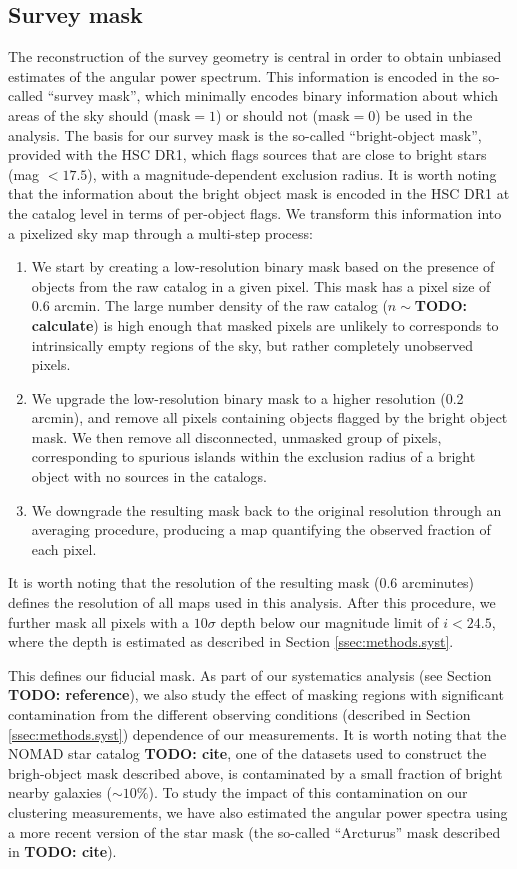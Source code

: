 \documentclass[a4paper,11pt]{article}
\newcommand{\todo}[1]{{\bf TODO: #1}}
\begin{document}
  \subsection{Survey mask}\label{ssec:methods.mask}
    The reconstruction of the survey geometry is central in order to obtain unbiased estimates of the angular power spectrum. This information is encoded in the so-called ``survey mask'', which minimally encodes binary information about which areas of the sky should (mask$=1$) or should not (mask$=0$) be used in the analysis. The basis for our survey mask is the so-called ``bright-object mask'', provided with the HSC DR1, which flags sources that are close to bright stars (mag $<17.5$), with a magnitude-dependent exclusion radius. It is worth noting that the information about the bright object mask is encoded in the HSC DR1 at the catalog level in terms of per-object flags. We transform this information into a pixelized sky map through a multi-step process:
    \begin{enumerate}
      \item We start by creating a low-resolution binary mask based on the presence of objects from the raw catalog in a given pixel. This mask has a pixel size of 0.6 arcmin. The large number density of the raw catalog  ($n\sim$\todo{calculate}) is high enough that masked pixels are unlikely to corresponds to intrinsically empty regions of the sky, but rather completely unobserved pixels.
      \item We upgrade the low-resolution binary mask to a higher resolution (0.2 arcmin), and remove all pixels containing objects flagged by the bright object mask. We then remove all disconnected, unmasked group of pixels, corresponding to spurious islands within the exclusion radius of a bright object with no sources in the catalogs.
      \item We downgrade the resulting mask back to the original resolution through an averaging procedure, producing a map quantifying the observed fraction of each pixel.
    \end{enumerate}
    It is worth noting that the resolution of the resulting mask ($0.6$ arcminutes) defines the resolution of all maps used in this analysis. After this procedure, we further mask all pixels with a $10\sigma$ depth below our magnitude limit of $i<24.5$, where the depth is estimated as described in Section \ref{ssec:methods.syst}.
    
    This defines our fiducial mask. As part of our systematics analysis (see Section \todo{reference}), we also study the effect of masking regions with significant contamination from the different observing conditions (described in Section \ref{ssec:methods.syst}) dependence of our measurements. It is worth noting that the NOMAD star catalog \todo{cite}, one of the datasets used to construct the brigh-object mask described above, is contaminated by a small fraction of bright nearby galaxies ($\sim10\%$). To study the impact of this contamination on our clustering measurements, we have also estimated the angular power spectra using a more recent version of the star mask (the so-called ``Arcturus'' mask described in \todo{cite}).
    
\end{document}
